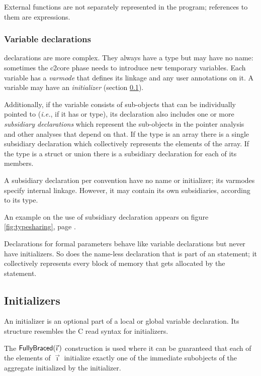 \begin{docpart}
External functions are not separately represented in the \coreC
program; references to them are  expressions.

\subsubsection{Variable declarations}
\label{sec:corecVariables}

 declarations are more complex. They always have a type but
may have no name: sometimes the c2core phase
needs to introduce new temporary variables. Each variable has a
\emph{varmode} that defines its linkage and any user annotations on
it. A variable may have an \emph{initializer} (section
\ref{sec:coreInitializers}).

Additionally, if the variable consists of sub-objects that can be
individually pointed to (\emph{i.e.}, if it has  or
 type), its declaration also includes one or
more \emph{subsidiary declarations} which represent the sub-objects
in the pointer analysis and other analyses that depend on that.
If the type is an array there is a single subsidiary declaration
which collectively represents the elements of the array. If the
type is a struct or union there is a subsidiary declaration for each
of its members.

A subsidiary declaration per convention have no name or
initializer; its varmodes specify internal linkage.
However, it may contain its own subsidiaries, according to its type.

An example on the use of subsidiary declaration appears on
figure \ref{fig:typesharing}, page \pageref{fig:typesharing}.

Declarations for formal parameters behave like variable declarations
but never have initializers. So does the name-less declaration that
is part of an  statement; it collectively represents every
block of memory that gets allocated by the statement.

\subsection{Initializers}
\label{sec:coreInitializers}

An initializer is an optional part of a local or global variable
declaration. Its structure resembles the C read syntax for
initializers.

The $\textsf{FullyBraced}(\vec\imath\,)$ construction is used where it
can be guaranteed that each of the elements of $\vec\imath$
initialize exactly one of the immediate subobjects of the aggregate
initialized by the initializer.


\end{docpart}
